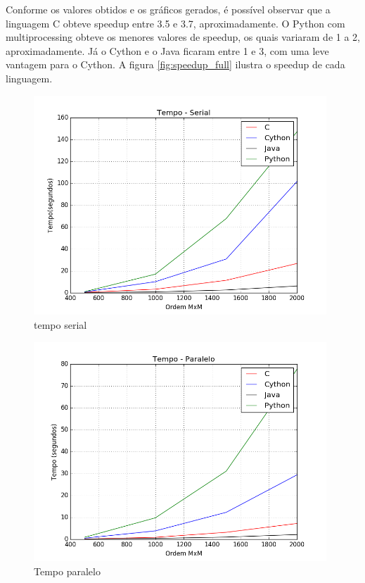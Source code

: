 \documentclass[a4paper,12pt]{article}
\begin{document}
Conforme os valores obtidos e os gráficos gerados, é possível observar que a linguagem C obteve speedup entre 3.5 e 3.7, aproximadamente. O Python com multiprocessing obteve os menores valores de speedup, os quais variaram de 1 a 2, aproximadamente. Já o Cython e o Java ficaram entre 1 e 3, com uma leve vantagem para o Cython. A figura \ref{fig:speedup_full} ilustra o speedup de cada linguagem. 


\begin{figure}[H]
  \centering
  \includegraphics[width=11.0cm]{pictures/tempo_serial.png}
  \caption{tempo serial}
\label{fig:tempo_serial}
\end{figure}

\begin{figure}[H]
  \centering
  \includegraphics[width=11.0cm]{pictures/tempo_paralelo.png}
  \caption{Tempo paralelo}
\label{fig:tempo_paralelo}
\end{figure}
\end{document}
